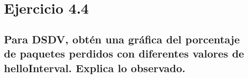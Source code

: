 \section{Ejercicio 4.4}

\subsection{Para DSDV, obtén una gráfica del porcentaje de paquetes perdidos con diferentes valores de helloInterval.
Explica lo observado.}
